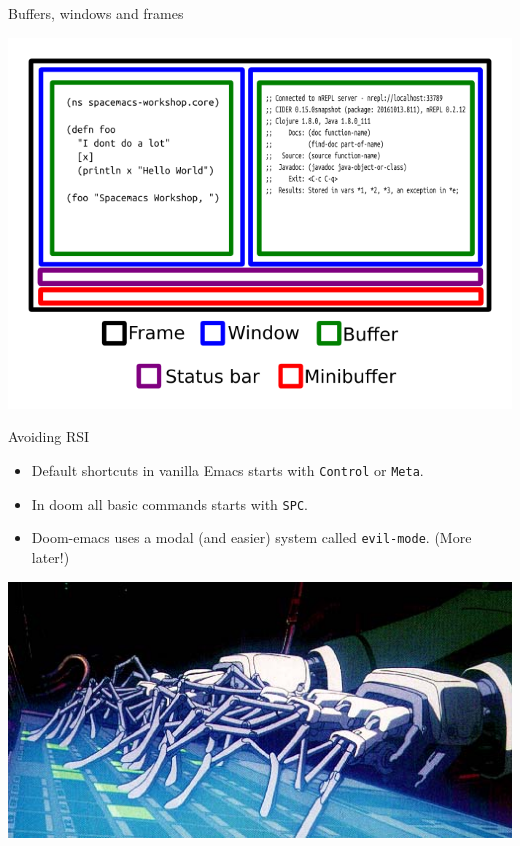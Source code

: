\documentclass[presentation]{beamer}
\begin{document}
\begin{frame}[label={sec:org7fe7db1}]{Buffers, windows and frames}
\begin{center}
\includegraphics[width=\textwidth]{./frames.png}
\end{center}
\end{frame}

\begin{frame}[label={sec:org380978c},fragile]{Avoiding RSI}
 \begin{itemize}
\item Default shortcuts in vanilla Emacs starts with \texttt{Control} or \texttt{Meta}.
\item In doom all basic commands starts with \texttt{SPC}.
\item Doom-emacs uses a modal (and easier) system called \texttt{evil-mode}. (More later!)
\end{itemize}


\begin{center}
\includegraphics[width=\textwidth]{./ghost.png}
\end{center}
\end{frame}
\end{document}
